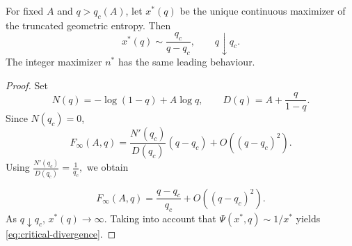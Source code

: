 \documentclass[10pt,a4paper]{amsart}
\begin{document}
\begin{proposition}
For fixed \(A\) and \(q>q_c(A)\), let \(x^*(q)\) be the unique
continuous maximizer of the truncated geometric entropy. Then
\begin{equation}
x^*(q)
\sim
\frac{q_c}{q-q_c},
\qquad
q\downarrow q_c.
\label{eq:critical-divergence}
\end{equation}
The integer maximizer \(n^*\) has the same leading behaviour.
\end{proposition}

\begin{proof}
Set
\[
N(q)=-\log(1-q)+A\log q,
\qquad
D(q)=A+\frac{q}{1-q}.
\]
Since \(N(q_c)=0\),
\[
F_\infty(A,q)
=
\frac{N'(q_c)}{D(q_c)}(q-q_c)
+
O\!\left((q-q_c)^2\right).
\]
Using ${\displaystyle \frac{N'(q_c)}{D(q_c)}
	=
	\frac{1}{q_c},}
$ we obtain

\begin{equation}
F_\infty(A,q)
=
\frac{q-q_c}{q_c}
+
O\!\left((q-q_c)^2\right).
\label{eq:Finfty-expansion}
\end{equation}
As \(q\downarrow q_c\),
\(x^*(q)\to\infty\). Taking into account that 
\(\Psi(x^*,q)\sim1/x^*\) yields
\eqref{eq:critical-divergence}.
\end{proof}
\end{document}
